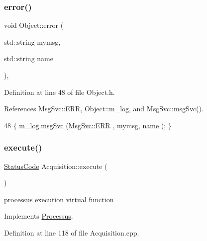 \subsubsection{\texorpdfstring{error()}{error()}\hspace{0.1cm}{\footnotesize\ttfamily [2/2]}}
{\footnotesize\ttfamily void Object\+::error (\begin{DoxyParamCaption}\item[{std\+::string}]{mymsg,  }\item[{std\+::string}]{name }\end{DoxyParamCaption})\hspace{0.3cm}{\ttfamily [inline]}, {\ttfamily [inherited]}}



Definition at line 48 of file Object.\+h.



References Msg\+Svc\+::\+E\+RR, Object\+::m\+\_\+log, and Msg\+Svc\+::msg\+Svc().


\begin{DoxyCode}
48 \{ \hyperlink{classObject_a0d269813dd7ac1f24bc143031e2963f2}{m\_log}.\hyperlink{classMsgSvc_ad25f18047920cc59a314e5098259711c}{msgSvc} (\hyperlink{classMsgSvc_ae671eb7301996cd049d2da8a65925926a35a9d7166e9896af4ec8fb33bf5f1772}{MsgSvc::ERR}     , mymsg, \hyperlink{classObject_a300f4c05dd468c7bb8b3c968868443c1}{name} ); \}
\end{DoxyCode}
\mbox{\label{classAcquisition_ae3b63064bee1b042914b63ae4135cbd8}} 
\subsubsection{\texorpdfstring{execute()}{execute()}}
{\footnotesize\ttfamily \hyperlink{classStatusCode}{Status\+Code} Acquisition\+::execute (\begin{DoxyParamCaption}{ }\end{DoxyParamCaption})\hspace{0.3cm}{\ttfamily [virtual]}}

processus execution virtual function 

Implements \hyperlink{classProcessus_a63767a63a1fb0055c5aa45b21a4a5d58}{Processus}.



Definition at line 118 of file Acquisition.\+cpp.



